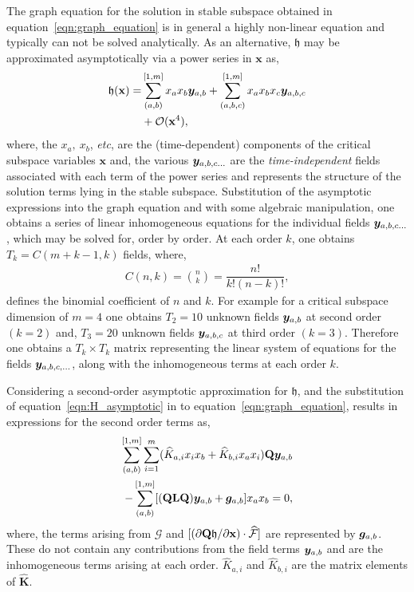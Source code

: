 The graph equation for the solution in stable subspace obtained in equation~\eqref{eqn:graph_equation} is in general a highly non-linear equation and typically can not be solved analytically. As an alternative, $\mathfrak{h}$ may be approximated asymptotically via a power series in $\mathbf{x}$ as, 
\begin{align}
	\label{eqn:H_asymptotic}
	\begin{split}
	\mathfrak{h}(\mathbf{x}) =& \sum_{(a,b)}^{[1,m]} x_{a}x_{b}\boldsymbol{y}_{a,b} +
	\sum_{(a,b,c)}^{[1,m]} x_{a}x_{b}x_{c}\boldsymbol{y}_{a,b,c} \\
	& + \mathcal{O}(\mathbf{x}^{4}),
\end{split}
\end{align}
where, the $x_{a},\ x_{b}$, \textit{etc}, are the (time-dependent) components of the critical subspace variables $\mathbf{x}$ and, the various $\boldsymbol{y}_{a,b,c\ldots}$ are the \emph{time-independent} fields associated with each term of the power series and represents the structure of the solution terms lying in the stable subspace. Substitution of the asymptotic expressions into the graph equation and with some algebraic manipulation, one obtains a series of linear inhomogeneous equations for the individual fields $\boldsymbol{y}_{a,b,c\ldots}$, which may be solved for, order by order. At each order $k$, one obtains $T_{k} = C(m+k-1,k)$ fields, where, 
\begin{align}
	\label{eqn:binomial}
	C(n,k) = \binom{n}{k} = \dfrac{n!}{k! (n-k)!},
\end{align}
defines the binomial coefficient of $n$ and $k$. For example for a critical subspace dimension of $m=4$ one obtains $T_{2} = 10$ unknown fields $\boldsymbol{y}_{a,b}$ at second order $(k=2)$ and, $T_{3} = 20$ unknown fields $\boldsymbol{y}_{a,b,c}$ at third order $(k=3)$. Therefore one obtains a $T_{k}\times T_{k}$ matrix representing the linear system of equations for the fields $\boldsymbol{y}_{a,b,c,\ldots}$, along with the inhomogeneous terms at each order $k$. 

Considering a second-order asymptotic approximation for $\mathfrak{h}$, and the substitution of equation~\eqref{eqn:H_asymptotic} in to equation~\eqref{eqn:graph_equation}, results in expressions for the second order terms as,
\begin{align}
	\begin{split}
	\sum_{(a,b)}^{[1,m]}\sum_{i=1}^{m}(\widehat{K}_{a,i}x_{i}x_{b} + \widehat{K}_{b,i}x_{a}x_{i})\mathbf{Q}\boldsymbol{y}_{a,b} \\
	- \sum_{(a,b)}^{[1,m]}[(\mathbf{Q}\mathbf{L}\mathbf{Q})\boldsymbol{y}_{a,b} + \boldsymbol{g}_{a,b}]x_{a}x_{b} = 0,
	\end{split}
\end{align}
where, the terms arising from $\mathcal{G}$ and $[(\partial \mathbf{Q}\mathfrak{h}/\partial \mathbf{x})\cdot \mathcal{\widehat{F}}]$ are represented by $\boldsymbol{g}_{a,b}$. These do not contain any contributions from the field terms $\boldsymbol{y}_{a,b}$ and are the inhomogeneous terms arising at each order.  $\widehat{K}_{a,i}$ and $\widehat{K}_{b,i}$ are the matrix elements of $\mathbf{\widehat{K}}$. 

